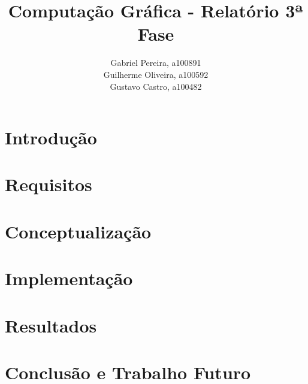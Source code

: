 \documentclass[a4paper,12pt]{article}
\title{\textbf{Computação Gráfica - Relatório 3ª Fase}}
\author{Gabriel Pereira, a100891\\
                Guilherme Oliveira, a100592\\
                Gustavo Castro, a100482}
\begin{document}
\begin{titlepage}
        \maketitle
\end{titlepage}


\section{Introdução}


\section{Requisitos}


\section{Conceptualização}


\section{Implementação}


\section{Resultados}


\section{Conclusão e Trabalho Futuro}


\end{document}

